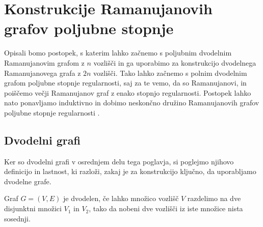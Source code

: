 \section{Konstrukcije Ramanujanovih grafov poljubne stopnje}
Opisali bomo postopek, s katerim lahko začnemo s poljubnim dvodelnim Ramanujanovim grafom z \(n\) vozlišči in ga uporabimo za konstrukcijo dvodelnega Ramanujanovega grafa z \(2n\) vozlišči. Tako lahko začnemo s polnim dvodelnim grafom poljubne stopnje regularnosti, saj za te vemo, da so Ramanujanovi, in poiščemo večji Ramanujanov graf z enako stopnjo regularnosti. Postopek lahko nato ponavljamo induktivno in dobimo neskončno družino Ramanujanovih grafov poljubne stopnje regularnosti \cite{marcus2014interlacingfamiliesibipartite}.

\subsection{Dvodelni grafi}
Ker so dvodelni grafi v osrednjem delu tega poglavja, si poglejmo njihovo definicijo in lastnost, ki razloži, zakaj je za konstrukcijo ključno, da uporabljamo dvodelne grafe.
\begin{definicija}
    Graf \(G = (V, E)\) je dvodelen, če lahko množico vozlišč \(V\) razdelimo na dve disjunktni množici \(V_1\) in \(V_2\), tako da nobeni dve vozlišči iz iste množice nista sosednji.
\end{definicija}

